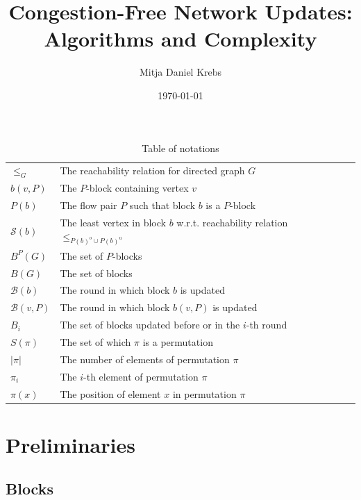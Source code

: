 \documentclass[fontsize=11pt,paper=a4]{book}
\author{Mitja Daniel Krebs}
\date{\today}
\title{Congestion-Free Network Updates: Algorithms and Complexity}
\begin{document}
\maketitle
\tableofcontents

\begin{table}[htbp]
\caption{Table of notations}
\centering
\begin{tabular}{ll}
\hyperref[orgea6953d]{\(\leq_G\)} & The reachability relation for directed graph \(G\)\\[0pt]
\hyperref[org858ac17]{\(b(v,P)\)} & The \(P\)-block containing vertex \(v\)\\[0pt]
\hyperref[orga1fa224]{\(P(b)\)} & The flow pair \(P\) such that block \(b\) is a \(P\)-block\\[0pt]
\hyperref[orgc5c33ba]{\(\mathcal{S}(b)\)} & The least vertex in block \(b\) w.r.t. reachability relation \(\leq_{P(b)^o\cup P(b)^u}\)\\[0pt]
\hyperref[orgb42e306]{\(B^P(G)\)} & The set of \(P\)-blocks\\[0pt]
\hyperref[orgafd4369]{\(B(G)\)} & The set of blocks\\[0pt]
\hyperref[org79f7d52]{\(\mathcal{B}(b)\)} & The round in which block \(b\) is updated\\[0pt]
\hyperref[org3ce10e5]{\(\mathcal{B}(v,P)\)} & The round in which block \(b(v,P)\) is updated\\[0pt]
\hyperref[org6460974]{\(B_i\)} & The set of blocks updated before or in the \(i\)-th round\\[0pt]
\hyperref[org8a1f029]{\(S(\pi)\)} & The set of which \(\pi\) is a permutation\\[0pt]
\hyperref[org8a1f029]{\(\lvert\pi\rvert\)} & The number of elements of permutation \(\pi\)\\[0pt]
\hyperref[org8a1f029]{\(\pi_i\)} & The \(i\)-th element of permutation \(\pi\)\\[0pt]
\hyperref[org8a1f029]{\(\pi(x)\)} & The position of element \(x\) in permutation \(\pi\)\\[0pt]
\end{tabular}
\end{table}

\part{Preliminaries}
\label{sec:org2de5357}

\chapter{Blocks}
\label{sec:org73aa1b8}
\end{document}
